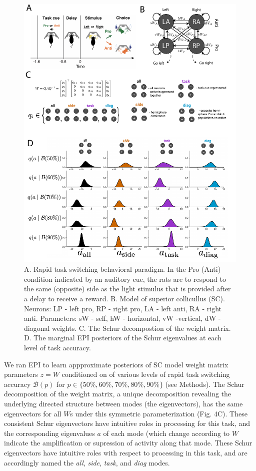 \documentclass[11pt]{article}
\begin{document}
\begin{figure}
\begin{center}
\includegraphics[scale=0.4]{figs/fig4/fig4.pdf}
\end{center}
\caption{A. Rapid task switching behavioral paradigm. In the Pro (Anti) condition indicated by an auditory cue, the rats are to respond to the same (opposite) side as the light stimulus that is provided after a delay to receive a reward. B. Model of superior collicullus (SC). Neurons: LP - left pro, RP - right pro, LA - left anti, RA - right anti.  Parameters: sW - self, hW - horizontal, vW -vertical, dW - diagonal weights. C. The Schur decompostion of the weight matrix. D. The marginal EPI posteriors of the Schur eigenvalues at each level of task accuracy.}
\end{figure}

We ran EPI to learn appproximate posteriors of SC model weight matrix parameters $z = W$ conditioned on of various levels of rapid task switching accuracy $\mathcal{B}(p)$ for $p \in \{50\%, 60\%, 70\%, 80\%, 90\%\}$ (see Methods).  The Schur decomposition of the weight matrix, a unique decomposition revealing the underlying directed structure between modes (the eigenvectors), has the same eigenvectors for all $W$s under this symmetric parameterization (Fig. 4C).
These consistent Schur eigenvectors have intuitive roles in processing for this task, and the corresponding eigenvalues $a$ of each mode (which change according to $W$ indicate the amplification or supression of activity along that mode.  These Schur eigenvectors have intuitive roles with respect to processing in this task, and are accordingly named the \textit{all}, \textit{side}, \textit{task}, and \textit{diag} modes. 
\end{document}
